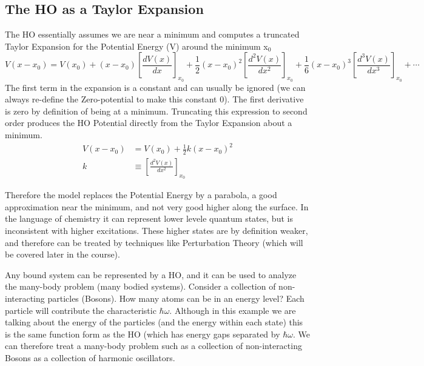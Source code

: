 \documentclass{article}
\newcommand{\be}{\begin{equation}}
\newcommand{\ee}{\end{equation}}
\begin{document}
\subsection*{The HO as a Taylor Expansion}
The HO essentially assumes we are near a minimum and computes a truncated Taylor Expansion for the Potential Energy (V) around the minimum x$_0$
\be
V(x - x_0) = V(x_0)  + (x-x_0) \left[\frac{dV(x)}{dx}\right]_{x_0} + \frac{1}{2}(x-x_0)^2  \left[\frac{d^2V(x)}{dx^2}\right]_{x_0} + \frac{1}{6} (x-x_0)^3  \left[\frac{d^3V(x)}{dx^3}\right]_{x_0} + \cdots
\ee
The first term in the expansion is a constant and can usually be ignored (we can always re-define the Zero-potential to make this constant 0).
The first derivative is zero by definition of being at a minimum.
Truncating this expression to second order produces the HO Potential directly from the Taylor Expansion about a minimum.
\be
\begin{split}
    V(x-x_0) &= V(x_0) +  \frac{1}{2}k(x-x_0)^2\\
    k &\equiv \left[\frac{d^2V(x)}{dx^2}\right]_{x_0}
\end{split}
\ee

Therefore the model replaces the Potential Energy by a parabola, a good approximation near the minimum, and not very good higher along the surface.
In the language of chemistry it can represent lower levele quantum states, but is inconsistent with higher excitations.
These higher states are by definition weaker, and therefore can be treated by techniques like Perturbation Theory (which will be covered later in the course).

Any bound system can be represented by a HO, and it can be used to analyze the many-body problem (many bodied systems).
Consider a collection of non-interacting particles (Bosons).
How many atoms can be in an energy level?
Each particle will contribute the characteristic $\hbar \omega$.
Although in this example we are talking about the energy of the particles (and the energy within each state) this is the same function  form as the HO (which has energy gaps separated by $\hbar \omega$.
We can therefore treat a many-body problem such as a collection of non-interacting Bosons as a collection of harmonic oscillators.
\end{document}
